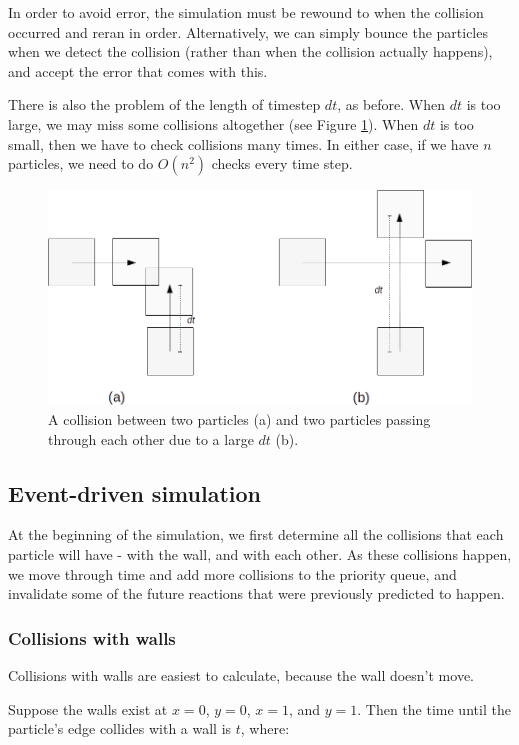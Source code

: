 \documentclass{article}
\begin{document}
In order to avoid error, the simulation must be rewound to when the collision occurred and reran in order.  Alternatively, we can simply bounce the particles when we detect the collision (rather than when the collision actually happens), and accept the error that comes with this.

There is also the problem of the length of timestep $dt$, as before.  When $dt$ is too large, we may miss some collisions altogether (see Figure \ref{particle-miss}).  When $dt$ is too small, then we have to check collisions many times.  In either case, if we have $n$ particles, we need to do $O(n^2)$ checks every time step.

\begin{figure}
\centering
\includegraphics[scale=0.4]{img/particle-miss.png}
\caption{A collision between two particles (a) and two particles passing through each other due to a large $dt$ (b).  \label{particle-miss}}
\end{figure}


\subsection{Event-driven simulation}
At the beginning of the simulation, we first determine all the collisions that each particle will have - with the wall, and with each other.  As these collisions happen, we move through time and add more collisions to the priority queue, and invalidate some of the future reactions that were previously predicted to happen.

\subsubsection{Collisions with walls}
Collisions with walls are easiest to calculate, because the wall doesn't move.  

Suppose the walls exist at $x=0$, $y=0$, $x=1$, and $y=1$.  Then the time until the particle's edge collides with a wall is $t$, where:
\end{document}
